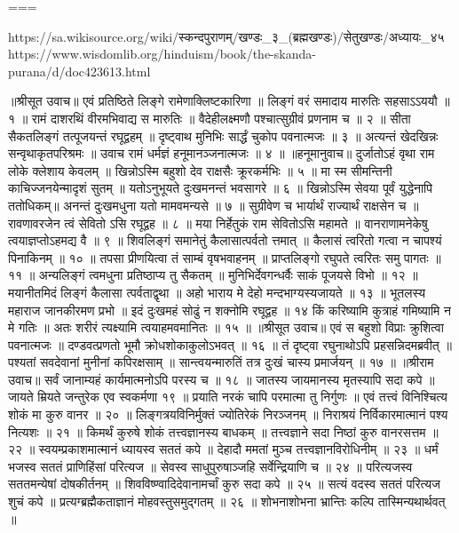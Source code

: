 ===

https://sa.wikisource.org/wiki/स्कन्दपुराणम्/खण्डः_३_(ब्रह्मखण्डः)/सेतुखण्डः/अध्यायः_४५
https://www.wisdomlib.org/hinduism/book/the-skanda-purana/d/doc423613.html

॥श्रीसूत उवाच॥
एवं प्रतिष्ठिते लिङ्गे रामेणाक्लिष्टकारिणा ॥
लिङ्गं वरं समादाय मारुतिः सहसाऽऽययौ ॥ १ ॥
रामं दाशरथिं वीरमभिवाद्य स मारुतिः ॥
वैदेहीलक्ष्मणौ पश्चात्सुग्रीवं प्रणनाम च ॥ २ ॥
सीता सैकतलिङ्गं तत्पूजयन्तं रघूद्वहम् ॥
दृष्ट्वाथ मुनिभिः सार्द्धं चुकोप पवनात्मजः ॥ ३ ॥
अत्यन्तं खेदखिन्नः सन्वृथाकृतपरिश्रमः ॥
उवाच रामं धर्मज्ञं हनूमानञ्जनात्मजः ॥ ४ ॥
॥हनूमानुवाच॥
दुर्जातोऽहं वृथा राम लोके क्लेशाय केवलम् ॥
खिन्नोऽस्मि बहुशो देव राक्षसैः क्रूरकर्मभिः ॥ ५ ॥
मा स्म सीमन्तिनी काचिज्जनयेन्मादृशं सुतम् ॥
यतोऽनुभूयते दुःखमनन्तं भवसागरे ॥ ६ ॥
खिन्नोऽस्मि सेवया पूर्वं युद्धेनापि ततोधिकम्॥
अनन्तं दुःखमधुना यतो मामवमन्यसे ॥ ७ ॥
सुग्रीवेण च भार्यार्थं राज्यार्थं राक्षसेन च ॥
रावणावरजेन त्वं सेवितो ऽसि रघूद्वह ॥ ८ ॥
मया निर्हेतुकं राम सेवितोऽसि महामते ॥
वानराणामनेकेषु त्वयाज्ञप्तोऽहमद्य वै ॥ ९ ॥
शिवलिङ्गं समानेतुं कैलासात्पर्वतो त्तमात् ॥
कैलासं त्वरितो गत्वा न चापश्यं पिनाकिनम् ॥ १० ॥
तपसा प्रीणयित्वा तं साम्बं वृषभवाहनम् ॥
प्राप्तलिङ्गो रघुपते त्वरितः समु पागतः ॥ ११ ॥
अन्यलिङ्गं त्वमधुना प्रतिष्ठाप्य तु सैकतम् ॥
मुनिभिर्देवगन्धर्वैः साकं पूजयसे विभो ॥ १२ ॥
मयानीतमिदं लिङ्गं कैलासा त्पर्वताद्वृथा ॥
अहो भाराय मे देहो मन्दभाग्यस्यजायते ॥ १३ ॥
भूतलस्य महाराज जानकीरमण प्रभो ॥
इदं दुःखमहं सोढुं न शक्नोमि रघूद्वह ॥ १४
किं करिष्यामि कुत्राहं गमिष्यामि न मे गतिः ॥
अतः शरीरं त्यक्ष्यामि त्वयाहमवमानितः ॥ १५ ॥
॥श्रीसूत उवाच॥
एवं स बहुशो विप्राः क्रुशित्वा पवनात्मजः ॥
दण्डवत्प्रणतो भूमौ क्रोधशोकाकुलोऽभवत् ॥ १६ ॥
तं दृष्ट्वा रघुनाथोऽपि प्रहसन्निदमब्रवीत् ॥
पश्यतां सवदेवानां मुनीनां कपिरक्षसाम् ॥
सान्त्वयन्मारुतिं तत्र दुःखं चास्य प्रमार्जयन् ॥ १७ ॥
॥श्रीराम उवाच॥
सर्वं जानाम्यहं कार्यमात्मनोऽपि परस्य च ॥ १८ ॥
जातस्य जायमानस्य मृतस्यापि सदा कपे ॥
जायते म्रियते जन्तुरेक एव स्वकर्मणा १९ ॥
प्रयाति नरकं चापि परमात्मा तु निर्गुणः ॥
एवं तत्त्वं विनिश्चित्य शोकं मा कुरु वानर ॥ २० ॥
लिङ्गत्रयविनिर्मुक्तं ज्योतिरेकं निरञ्जनम् ॥
निराश्रयं निर्विकारमात्मानं पश्य नित्यशः ॥ २१ ॥
किमर्थं कुरुषे शोकं तत्त्वज्ञानस्य बाधकम् ॥
तत्त्वज्ञाने सदा निष्ठां कुरु वानरसत्तम ॥ २२ ॥
स्वयम्प्रकाशमात्मानं ध्यायस्व सततं कपे ॥
देहादौ ममतां मुञ्च तत्त्वज्ञानविरोधिनीम् ॥ २३ ॥
धर्मं भजस्व सततं प्राणिहिंसां परित्यज ॥
सेवस्व साधुपुरुषाञ्जहि सर्वेन्द्रियाणि च ॥ २४ ॥
परित्यजस्व सततमन्येषां दोषकीर्तनम् ॥
शिवविष्ण्वादिदेवानामर्चां कुरु सदा कपे ॥ २५ ॥
सत्यं वदस्व सततं परित्यज शुचं कपे ॥
प्रत्यग्ब्रह्मैकताज्ञानं मोहवस्तुसमुद्गतम् ॥ २६ ॥
शोभनाशोभना भ्रान्तिः कल्पि तास्मिन्यथार्थवत् ॥

